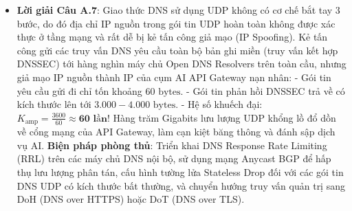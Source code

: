 \begin{itemize}
  \item \textbf{Lời giải Câu A.7}:
  Giao thức DNS sử dụng UDP không có cơ chế bắt tay 3 bước, do đó địa chỉ IP nguồn trong gói tin UDP hoàn toàn không được xác thực ở tầng mạng và rất dễ bị kẻ tấn công giả mạo (IP Spoofing).
  Kẻ tấn công gửi các truy vấn DNS yêu cầu toàn bộ bản ghi miền (truy vấn  kết hợp DNSSEC) tới hàng nghìn máy chủ Open DNS Resolvers trên toàn cầu, nhưng giả mạo IP nguồn thành IP của cụm AI API Gateway nạn nhân:
  - Gói tin yêu cầu gửi đi chỉ tốn khoảng $60\text{ bytes}$.
  - Gói tin phản hồi DNSSEC trả về có kích thước lên tới $3.000 - 4.000\text{ bytes}$.
  - Hệ số khuếch đại: $K_{\text{amp}} = \frac{3600}{60} \approx \mathbf{60 \text{ lần!}}$
  Hàng trăm Gigabits lưu lượng UDP khổng lồ đổ dồn về cổng mạng của API Gateway, làm cạn kiệt băng thông và đánh sập dịch vụ AI.
  \textbf{Biện pháp phòng thủ}: Triển khai DNS Response Rate Limiting (RRL) trên các máy chủ DNS nội bộ, sử dụng mạng Anycast BGP để hấp thụ lưu lượng phân tán, cấu hình tường lửa Stateless Drop đối với các gói tin DNS UDP có kích thước bất thường, và chuyển hướng truy vấn quản trị sang DoH (DNS over HTTPS) hoặc DoT (DNS over TLS).
\end{itemize}

